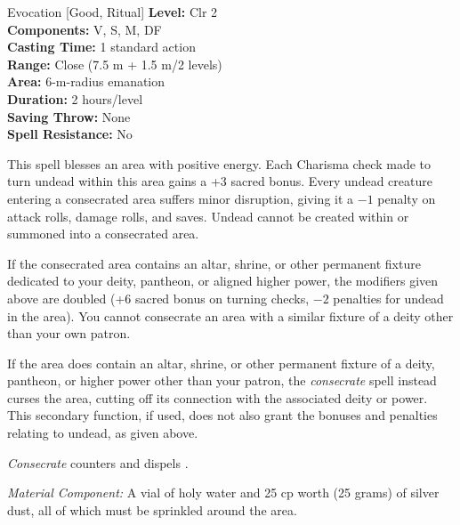 {Evocation [Good, Ritual]}
{
	\textbf{Level:}
	Clr 2\\
	\textbf{Components:}
	V, S, M, DF\\
	\textbf{Casting Time:}
	1 standard action\\
	\textbf{Range:}
	Close (7.5 m + 1.5 m/2 levels)\\
	\textbf{Area:}
	6-m-radius emanation\\
	\textbf{Duration:}
	2 hours/level\\
	\textbf{Saving Throw:}
	None\\
	\textbf{Spell Resistance:}
	No\\
}
{
	This spell blesses an area with positive energy. Each Charisma check made to turn undead within this area gains a +3 sacred bonus. Every undead creature entering a consecrated area suffers minor disruption, giving it a $-1$ penalty on attack rolls, damage rolls, and saves. Undead cannot be created within or summoned into a consecrated area.

	If the consecrated area contains an altar, shrine, or other permanent fixture dedicated to your deity, pantheon, or aligned higher power, the modifiers given above are doubled (+6 sacred bonus on turning checks, $-2$ penalties for undead in the area). You cannot consecrate an area with a similar fixture of a deity other than your own patron.

	If the area does contain an altar, shrine, or other permanent fixture of a deity, pantheon, or higher power other than your patron, the \emph{consecrate} spell instead curses the area, cutting off its connection with the associated deity or power. This secondary function, if used, does not also grant the bonuses and penalties relating to undead, as given above.

	\emph{Consecrate} counters and dispels .

	\textit{Material Component:}
	A vial of holy water and 25 cp worth (25 grams) of silver dust, all of which must be sprinkled around the area.

}
